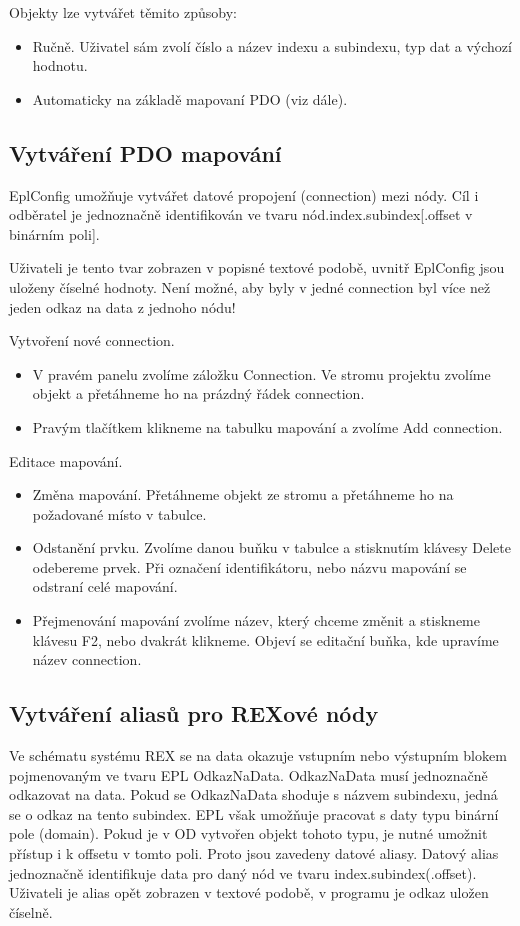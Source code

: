 Objekty lze vytvářet těmito způsoby:

\begin{itemize}
\item Ručně. Uživatel sám zvolí číslo a název indexu a subindexu, typ dat a výchozí hodnotu.
\item Automaticky na základě mapovaní PDO (viz dále).
\end{itemize}

\subsection{Vytváření PDO mapování}
EplConfig umožňuje vytvářet datové propojení (connection) mezi nódy. 
Cíl i odběratel je jednoznačně identifikován ve tvaru nód.index.subindex[.offset v binárním poli]. 

Uživateli je tento tvar zobrazen v popisné textové podobě, uvnitř EplConfig jsou uloženy číselné hodnoty. 
Není možné, aby byly v jedné connection byl více než jeden odkaz na data z jednoho nódu!

Vytvoření nové connection.
\begin{itemize}
\item V pravém panelu zvolíme záložku Connection. 
Ve stromu projektu zvolíme objekt a přetáhneme ho na prázdný řádek connection.
\item Pravým tlačítkem klikneme na tabulku mapování a zvolíme Add connection.
\end{itemize}

Editace mapování.
\begin{itemize}
\item Změna mapování. Přetáhneme objekt ze stromu a přetáhneme ho na požadované místo v tabulce.
\item Odstanění prvku. Zvolíme danou buňku v tabulce a stisknutím klávesy Delete odebereme prvek. 
Při označení identifikátoru, nebo názvu mapování se odstraní celé mapování.
\item Přejmenování mapování zvolíme název, který chceme změnit a stiskneme klávesu F2, nebo dvakrát klikneme.
Objeví se editační buňka, kde upravíme název connection.
\end{itemize}

\subsection{Vytváření aliasů pro REXové nódy}
Ve schématu systému REX se na data okazuje vstupním nebo výstupním blokem pojmenovaným ve tvaru EPL OdkazNaData.
OdkazNaData musí jednoznačně odkazovat na data. 
Pokud se OdkazNaData shoduje s názvem subindexu, jedná se o odkaz na tento subindex. 
EPL však umožňuje pracovat s daty typu binární pole (domain). 
Pokud je v OD vytvořen objekt tohoto typu, je nutné umožnit přístup i k offsetu v tomto poli. 
Proto jsou zavedeny datové aliasy. 
Datový alias jednoznačně identifikuje data pro daný nód ve tvaru index.subindex(.offset). 
Uživateli je alias opět zobrazen v textové podobě, v programu je odkaz uložen číselně.

